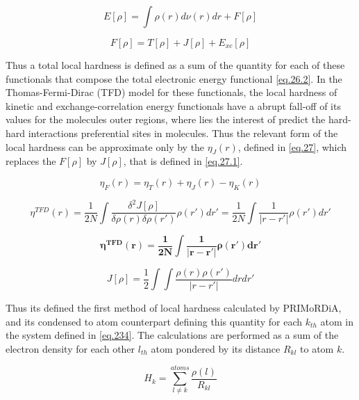 \documentclass[a4paper,11pt]{refart}
\begin{document}
\begin{equation}
E[\rho] =  \int \rho(r) d \nu (r) dr + F[\rho]
\label{eq.1.0}
\end{equation}

\begin{equation}
F[\rho] = T[\rho] + J[\rho] + E_{xc}[\rho]
\label{eq.26.4}
\end{equation}

Thus a total local hardness is defined as a sum of the quantity for each of these functionals that compose the total electronic energy functional \autoref{eq.26.2}. In the Thomas-Fermi-Dirac (TFD) model for these functionals, the local hardness of kinetic and exchange-correlation energy functionals have a abrupt fall-off of its values for the molecules outer regions, where lies the interest of predict the hard-hard interactions preferential sites in molecules. Thus the relevant form of the local hardness can be approximate only by the $\eta_J(r)$, defined in \autoref{eq.27}, which replaces the $F[\rho]$ by $J[\rho]$, that is defined in \autoref{eq.27.1}.

\begin{equation}
\eta_{F} (r) = \eta_{T}(r)+ \eta_{J}(r) - \eta_{K}(r)
\label{eq.26.2}
\end{equation}

\begin{equation}
\eta^{TFD} (r) = \frac{1}{2N} \int \frac{\delta^2 J[\rho]}{\delta \rho(r) \delta \rho(r')} \rho(r')dr' = \frac{1}{2N} \int \frac{1}{|r-r'|} \rho(r') dr'
\label{eq.27} 
\end{equation}

\begin{equation}
\mathbf{\eta^{TFD} (r) =  \frac{1}{2N} \int \frac{1}{|r-r'|} \rho(r') dr'}
\label{eq.27999} 
\end{equation}

\begin{equation}
J[\rho] = \frac{1}{2} \int \int \frac{\rho(r) \rho(r')}{|r-r'|} dr dr'
\label{eq.27.1}
\end{equation}

Thus its defined the first method of local hardness calculated by PRIMoRDiA, and its condensed to atom counterpart defining this quantity for each $k_{th}$ atom in the system defined in \autoref{eq.234}. The calculations are performed as a sum of the electron density for each other $l_{th}$ atom pondered by its distance $R_{kl}$ to atom $k$. 

\begin{equation}
H_k = \sum_{l \neq k}^{atoms} \frac{\rho(l)}{R_{kl}}
\label{eq.234}
\end{equation}
\end{document}
